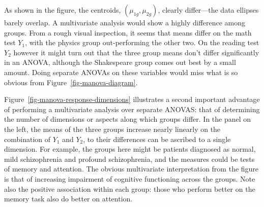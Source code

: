 \documentclass[
  letterpaper,
  10pt,
  krantz2]{krantz}
\begin{document}
{\begin{figure}
\end{figure}%

As shown in the figure, the centroids, \((\mu_{1g}, \mu_{2g})\), clearly
differ---the data ellipses barely overlap. A multivariate analysis would
show a highly difference among groups. From a rough visual inspection,
it seems that means differ on the math test \(Y_1\), with the physics
group out-performing the other two. On the reading test \(Y_2\) however
it might turn out that the three group means don't differ significantly
in an ANOVA, although the Shakespeare group comes out best by a small
amount. Doing separate ANOVAs on these variables would miss what is so
obvious from Figure~\ref{fig-manova-diagram}.

Figure~\ref{fig-manova-response-dimensions} illustrates a second
important advantage of performing a multivariate analysis over separate
ANOVAS: that of determining the number of dimensions or aspects along
which groups differ. In the panel on the left, the means of the three
groups increase nearly linearly on the combination of \(Y_1\) and
\(Y_2\), to their differences can be ascribed to a single dimension. For
example, the groups here might be patients diagnosed as normal, mild
schizophrenia and profound schizophrenia, and the measures could be
tests of memory and attention. The obvious multivariate interpretation
from the figure is that of increasing impairment of cognitive
functioning across the groups. Note also the positive association within
each group: those who perform better on the memory task also do better
on attention.

\begin{figure}

\end{figure}}
\end{document}

